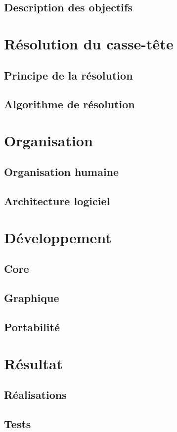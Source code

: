 \documentclass[a4paper,10pt]{report}
\begin{document}
\chapter{Description des objectifs}


\part{Résolution du casse-tête}
\chapter{Principe de la résolution}

\chapter{Algorithme de résolution}


\part{Organisation}
\chapter{Organisation humaine}

\chapter{Architecture logiciel}


\part{Développement}
\chapter{Core}

\chapter{Graphique}

\chapter{Portabilité}


\part{Résultat}
\chapter{Réalisations}

\chapter{Tests}


\listoffigures
\lstlistoflistings

\printindex
\end{document}

